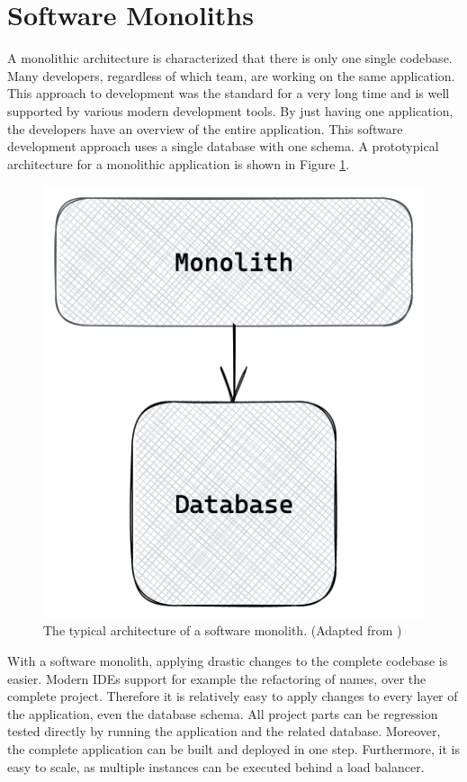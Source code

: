 \section{Software Monoliths}\label{section:background:software-monolith}

A monolithic architecture is characterized that there is only one single codebase. Many developers, regardless of which team, are working on the same application. This approach to development was the standard for a very long time and is well supported by various modern development tools. By just having one application, the developers have an overview of the entire application. This software development approach uses a single database with one schema. A prototypical architecture for a monolithic application is shown in Figure \ref{fig:background:monolith:monolith-sketch}.

\ifshowImages
\begin{figure}[H]
  \centering
  \includegraphics[width=0.3\linewidth]{images/background/monolith/monolith-sketch.png}
  \caption{The typical architecture of a software monolith. (Adapted from \cite[12]{book:2019:newman:background:monolith:monolith-to-microservices})}\label{fig:background:monolith:monolith-sketch}
\end{figure}
\fi

\bigskip

\noindent With a software monolith, applying drastic changes to the complete codebase is easier. Modern \acp{IDE} support for example the refactoring of names, over the complete project. Therefore it is relatively easy to apply changes to every layer of the application, even the database schema. All project parts can be regression tested directly by running the application and the related database. Moreover, the complete application can be built and deployed in one step. Furthermore, it is easy to scale, as multiple instances can be executed behind a load balancer. \cite[4]{book:2018:richardson:background:bff:microservices-patterns}

\bigskip

